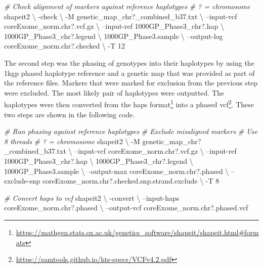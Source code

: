 \documentclass[]{report}
\newenvironment{Shaded}{\begin{snugshade}}{\end{snugshade}}
\newcommand{\CommentTok}[1]{\textcolor[rgb]{0.56,0.35,0.01}{\textit{#1}}}
\newcommand{\ExtensionTok}[1]{#1}
\newcommand{\NormalTok}[1]{#1}
\begin{document}
\begin{Shaded}
\begin{Highlighting}[]
\CommentTok{# Check alignment of markers against reference haplotypes}
\CommentTok{# ? = chromosome}
\ExtensionTok{shapeit2}\NormalTok{ \textbackslash{}}
\NormalTok{-check \textbackslash{}}
\NormalTok{-M genetic_map_chr?_combined_b37.txt \textbackslash{}}
\NormalTok{--input-vcf coreExome_norm.chr?.vcf.gz \textbackslash{}}
\NormalTok{--input-ref 1000GP_Phase3_chr?.hap \textbackslash{}}
\NormalTok{  1000GP_Phase3_chr?.legend \textbackslash{}}
\NormalTok{  1000GP_Phase3.sample \textbackslash{}}
\NormalTok{  --output-log coreExome_norm.chr?.checked \textbackslash{}}
\NormalTok{  -T 12}
\end{Highlighting}
\end{Shaded}

The second step was the phasing of genotypes into their haplotypes by
using the \gls{1kgp} phased haplotype reference and a genetic map that
was provided as part of the reference files. Markers that were marked
for exclusion from the previous step were excluded. The most likely pair
of haplotypes were outputted. The haplotypes were then converted from
the haps format\footnote{\url{https://mathgen.stats.ox.ac.uk/genetics_software/shapeit/shapeit.html\#formats}}
into a phased \gls{vcf}\footnote{\url{https://samtools.github.io/hts-specs/VCFv4.2.pdf}}.
These two steps are shown in the following code.

\begin{Shaded}
\begin{Highlighting}[]
\CommentTok{# Run phasing against reference haplotypes}
\CommentTok{# Exclude misaligned markers}
\CommentTok{# Use 8 threads}
\CommentTok{# ? = chromosome}
\ExtensionTok{shapeit2}\NormalTok{ \textbackslash{}}
\NormalTok{-M genetic_map_chr?_combined_b37.txt \textbackslash{}}
\NormalTok{--input-vcf coreExome_norm.chr?.vcf.gz \textbackslash{}}
\NormalTok{--input-ref 1000GP_Phase3_chr?.hap \textbackslash{}}
\NormalTok{  1000GP_Phase3_chr?.legend \textbackslash{}}
\NormalTok{  1000GP_Phase3.sample \textbackslash{}}
\NormalTok{--output-max coreExome_norm.chr?.phased \textbackslash{}}
\NormalTok{--exclude-snp coreExome_norm.chr?.checked.snp.strand.exclude \textbackslash{}}
\NormalTok{-T 8}

\CommentTok{# Convert haps to vcf}
\ExtensionTok{shapeit2}\NormalTok{ \textbackslash{}}
\NormalTok{-convert \textbackslash{}}
\NormalTok{--input-haps coreExome_norm.chr?.phased \textbackslash{}}
\NormalTok{--output-vcf coreExome_norm.chr?.phased.vcf }
\end{Highlighting}
\end{Shaded}
\end{document}
